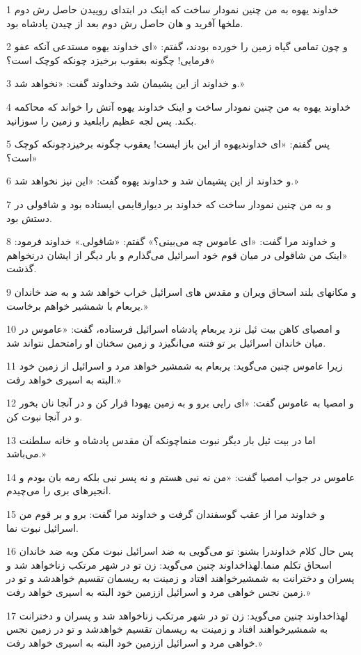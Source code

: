 \par 1 خداوند یهوه به من چنین نمودار ساخت که اینک در ابتدای روییدن حاصل رش دوم ملخها آفرید و هان حاصل رش دوم بعد از چیدن پادشاه بود.
\par 2 و چون تمامی گیاه زمین را خورده بودند، گفتم: «ای خداوند یهوه مستدعی آنکه عفو فرمایی! چگونه بعقوب برخیزد چونکه کوچک است؟»
\par 3 و خداوند از این پشیمان شد وخداوند گفت: «نخواهد شد.»
\par 4 خداوند یهوه به من چنین نمودار ساخت و اینک خداوند یهوه آتش را خواند که محاکمه بکند. پس لجه عظیم رابلعید و زمین را سوزانید.
\par 5 پس گفتم: «ای خداوندیهوه از این باز ایست! یعقوب چگونه برخیزدچونکه کوچک است؟»
\par 6 و خداوند از این پشیمان شد و خداوند یهوه گفت: «این نیز نخواهد شد.»
\par 7 و به من چنین نمودار ساخت که خداوند بر دیوارقایمی ایستاده بود و شاقولی در دستش بود.
\par 8 و خداوند مرا گفت: «ای عاموس چه می‌بینی؟» گفتم: «شاقولی.» خداوند فرمود: «اینک من شاقولی در میان قوم خود اسرائیل می‌گذارم و بار دیگر از ایشان درنخواهم گذشت.
\par 9 و مکانهای بلند اسحاق ویران و مقدس های اسرائیل خراب خواهد شد و به ضد خاندان یربعام با شمشیر خواهم برخاست.»
\par 10 و امصیای کاهن بیت ئیل نزد یربعام پادشاه اسرائیل فرستاده، گفت: «عاموس در میان خاندان اسرائیل بر تو فتنه می‌انگیزد و زمین سخنان او رامتحمل نتواند شد.
\par 11 زیرا عاموس چنین می‌گوید: یربعام به شمشیر خواهد مرد و اسرائیل از زمین خود البته به اسیری خواهد رفت.»
\par 12 و امصیا به عاموس گفت: «ای رایی برو و به زمین یهودا فرار کن و در آنجا نان بخور و در آنجا نبوت کن.
\par 13 اما در بیت ئیل بار دیگر نبوت منماچونکه آن مقدس پادشاه و خانه سلطنت می‌باشد.»
\par 14 عاموس در جواب امصیا گفت: «من نه نبی هستم و نه پسر نبی بلکه رمه بان بودم و انجیرهای بری را می‌چیدم.
\par 15 و خداوند مرا از عقب گوسفندان گرفت و خداوند مرا گفت: برو و بر قوم من اسرائیل نبوت نما.
\par 16 پس حال کلام خداوندرا بشنو: تو می‌گویی به ضد اسرائیل نبوت مکن وبه ضد خاندان اسحاق تکلم منما.لهذاخداوند چنین می‌گوید: زن تو در شهر مرتکب زناخواهد شد و پسران و دخترانت به شمشیرخواهند افتاد و زمینت به ریسمان تقسیم خواهدشد و تو در زمین نجس خواهی مرد و اسرائیل اززمین خود البته به اسیری خواهد رفت.»
\par 17 لهذاخداوند چنین می‌گوید: زن تو در شهر مرتکب زناخواهد شد و پسران و دخترانت به شمشیرخواهند افتاد و زمینت به ریسمان تقسیم خواهدشد و تو در زمین نجس خواهی مرد و اسرائیل اززمین خود البته به اسیری خواهد رفت.»

